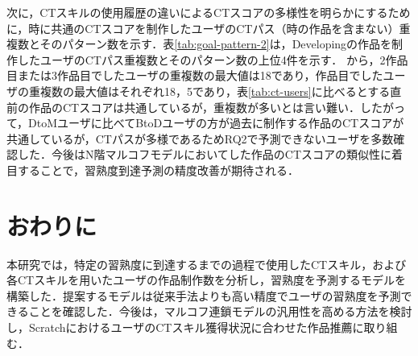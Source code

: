 \documentclass[submit]{ipsj}
\begin{document}
次に，CTスキルの使用履歴の違いによるCTスコアの多様性を明らかにするために，\textcolor{red}{}時に共通のCTスコアを制作したユーザのCTパス（\textcolor{red}{}時の作品を含まない）重複数とそのパターン数を示す．表\ref{tab:goal-pattern-2}は，\textcolor{red}{}Developingの作品を制作したユーザのCTパス重複数とそのパターン数の上位4件を示す．\textcolor{red}{}
から，2作品目または3作品目で\textcolor{red}{}したユーザの重複数の最大値は18であり，\textcolor{red}{}作品目で\textcolor{red}{}したユーザの重複数の最大値はそれぞれ18，5であり，表\ref{tab:ct-users}に比べると\textcolor{red}{}する直前の作品のCTスコアは共通しているが，重複数が多いとは言い難い．したがって，DtoMユーザに比べてBtoDユーザの方が過去に制作する作品のCTスコアが共通しているが，CTパスが多様であるためRQ2で予測できないユーザを多数確認した．今後はN階マルコフモデルにおいて\textcolor{red}{}した作品のCTスコアの類似性に着目することで，習熟度到達予測の精度改善が期待される．

\section{おわりに}\label{sec:conc}

本研究では，特定の習熟度に到達するまでの過程で使用したCTスキル，および各CTスキルを用いたユーザの作品制作数を分析し，習熟度を予測するモデルを構築した．提案するモデルは従来手法よりも高い精度でユーザの習熟度を予測できることを確認した．今後は，マルコフ連鎖モデルの汎用性を高める方法を検討し，ScratchにおけるユーザのCTスキル獲得状況に合わせた作品推薦に取り組む．


%
%



\begin{biography}
%
\end{biography}
\end{document}
